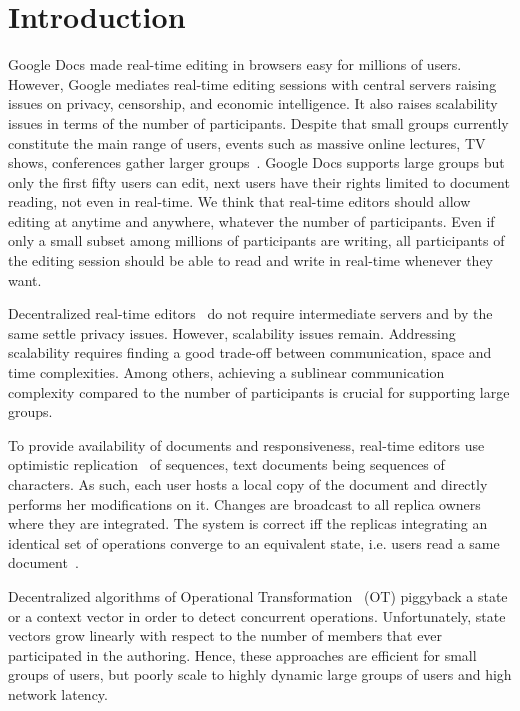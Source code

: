 

\section{Introduction}

Google Docs made real-time editing in browsers easy for millions of
users. However, Google mediates real-time editing sessions with central servers
raising issues on privacy, censorship, and economic intelligence. It also raises
scalability issues in terms of the number of participants.  Despite that small
groups currently constitute the main range of users, events such as massive
online lectures, TV shows, conferences gather larger
groups~\cite{breslow2013studying}.  Google Docs supports large groups but only
the first fifty users can edit, next users have their rights limited to document
reading, not even in real-time.  We think that real-time editors should allow
editing at anytime and anywhere, whatever the number of participants. Even if
only a small subset among millions of participants are writing, all participants
of the editing session should be able to read and write in real-time whenever
they want.

Decentralized real-time editors~\cite{oster2006data, sun1998operational,
  sun2009contextbased} do not require intermediate servers and by the same
settle privacy issues. However, scalability issues remain.  Addressing
scalability requires finding a good trade-off between communication, space and
time complexities. Among others, achieving a sublinear communication complexity
compared to the number of participants is crucial for supporting large groups.

To provide availability of documents and responsiveness, real-time editors use
optimistic replication~\cite{saito2005optimistic} of sequences, text documents
being sequences of characters. As such, each user hosts a local copy of the
document and directly performs her modifications on it. Changes are broadcast to
all replica owners where they are integrated. The system is correct iff the
replicas integrating an identical set of operations converge to an equivalent
state, i.e. users read a same document~\cite{shapiro2011conflict}.

Decentralized algorithms of Operational
Transformation~\cite{sun2009contextbased} (OT) piggyback a state or a context
vector in order to detect concurrent operations. Unfortunately, state vectors
grow linearly with respect to the number of members that ever participated in
the authoring. Hence, these approaches are efficient for small groups of users,
but poorly scale to highly dynamic large groups of users and high network
latency.

